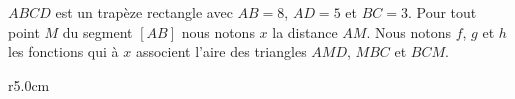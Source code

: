 
\begin{exercice}\label{exosmath-0552}

    \( ABCD\) est un trapèze rectangle avec \( AB=8\), \( AD=5\) et \( BC=3\). Pour tout point \( M\) du segment \( [AB]\) nous notons \( x\) la distance \( AM\). Nous notons \( f\), \( g\) et \( h\) les fonctions qui à \( x\) associent l'aire des triangles \( AMD\), \( MBC\) et \( BCM\).

\begin{wrapfigure}{r}{5.0cm}
   \vspace{-0.5cm}        %
   \centering
   
\end{wrapfigure}

\end{exercice}
